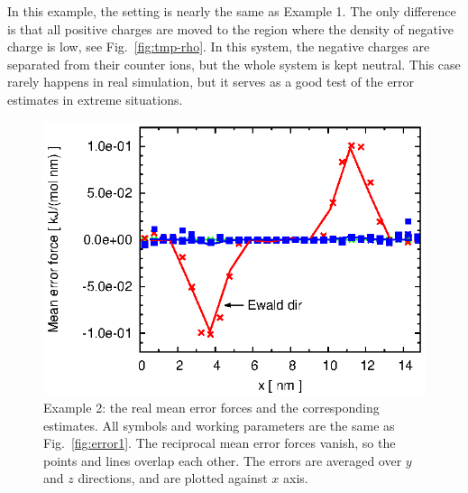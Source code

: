 \documentclass[aps,pre,preprint,unsortedaddress]{revtex4}
\begin{document}
In this example, the setting is nearly the same as
Example 1. The only difference is that all positive charges
are moved to the region where the density of negative charge is low,
see Fig.~\ref{fig:tmp-rho}.
In this system, the negative charges are separated from their
counter ions, but the whole system is kept neutral. This case rarely
happens in real simulation, but it serves as a good test of the error
estimates in extreme situations.

\begin{figure}
  \centering
  \includegraphics[]{fig.rand2.meanf.eps}
  \caption{
    Example 2: the real mean error forces and the corresponding
    estimates. All symbols and working parameters are the same
    as     Fig.~\ref{fig:error1}.
    The reciprocal mean error forces vanish, so the points and lines
    overlap each other. 
    The errors are averaged over $y$ and $z$ directions, and are
    plotted against $x$ axis.
    }
  \label{fig:meanf2}
\end{figure}
\end{document}
